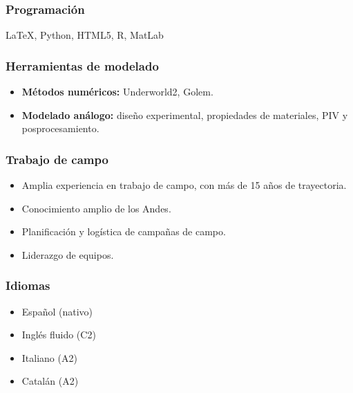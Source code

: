 


    \subsubsection*{Programación} %
    {\LaTeX{}, Python, HTML5, R, MatLab} %


      \subsubsection*{Herramientas de modelado} %
    \begin{itemize}
        \item {\textbf{Métodos numéricos:} Underworld2, Golem.}

        \item {\textbf{Modelado análogo:} diseño experimental, propiedades de materiales, PIV y posprocesamiento.}%
    \end{itemize}

  \subsubsection*{Trabajo de campo} %
    \begin{itemize}
        \item {Amplia experiencia en trabajo de campo, con más de 15 años de trayectoria.}

        \item {Conocimiento amplio de los Andes.}

        \item {Planificación y logística de campañas de campo.}

        \item {Liderazgo de equipos.}
    \end{itemize}
 \subsubsection*{Idiomas} %
  \begin{itemize}
      
      \item {Español (nativo)}
      
      \item {Inglés fluido (C2)}

      \item {Italiano (A2)}

      \item {Catalán (A2)} %

  \end{itemize}

